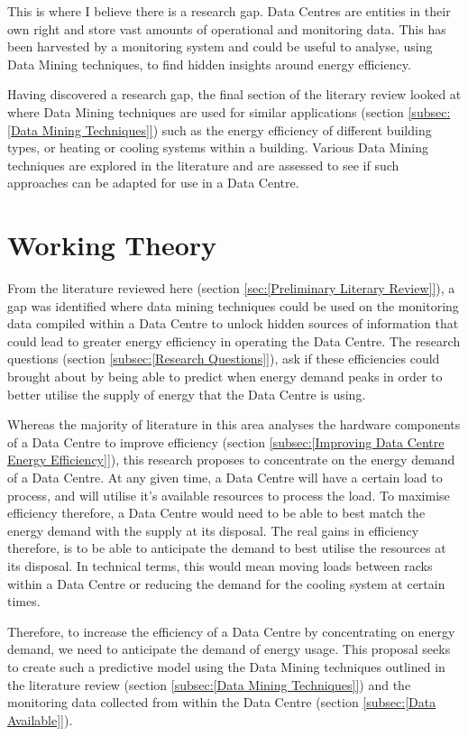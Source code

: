 \documentclass[12pt]{scrartcl}
\begin{document}
This is where I believe there is a research gap. Data Centres are entities in their own right and store vast amounts of operational and monitoring data. This has been harvested by a monitoring system and could be useful to analyse, using Data Mining techniques, to find hidden insights around energy efficiency. 

Having discovered a research gap, the final section of the literary review looked at where Data Mining techniques are used for similar applications (section \ref{subsec:[Data Mining Techniques]}) such as the energy efficiency of different building types, or heating or cooling systems within a building. Various Data Mining techniques are explored in the literature and are assessed to see if such approaches can be adapted for use in a Data Centre.   

\section{Working Theory}
\label{sec:[Working Theory]}
From the literature reviewed here (section \ref{sec:[Preliminary Literary Review]}), a gap was identified where data mining techniques could be used on the monitoring data compiled within a Data Centre to unlock hidden sources of information that could lead to greater energy efficiency in operating the Data Centre. The research questions (section \ref{subsec:[Research Questions]}), ask if these efficiencies could brought about by being able to predict when energy demand peaks in order to better utilise the supply of energy that the Data Centre is using. 

Whereas the majority of literature in this area analyses the hardware components of a Data Centre to improve efficiency (section \ref{subsec:[Improving Data Centre Energy Efficiency]}), this research proposes to concentrate on the energy demand of a Data Centre. At any given time, a Data Centre will have a certain load to process, and will utilise it's available resources to process the load. To maximise efficiency therefore, a Data Centre would need to be able to best match the energy demand with the supply at its disposal. The real gains in efficiency therefore, is to be able to anticipate the demand to best utilise the resources at its disposal. In technical terms, this would mean moving loads between racks within a Data Centre or reducing the demand for the cooling system at certain times. 

Therefore, to increase the efficiency of a Data Centre by concentrating on energy demand, we need to anticipate the demand of energy usage. This proposal seeks to create such a predictive model using the Data Mining techniques outlined in the literature review (section \ref{subsec:[Data Mining Techniques]}) and the monitoring data collected from within the Data Centre (section \ref{subsec:[Data Available]}).
\end{document}
